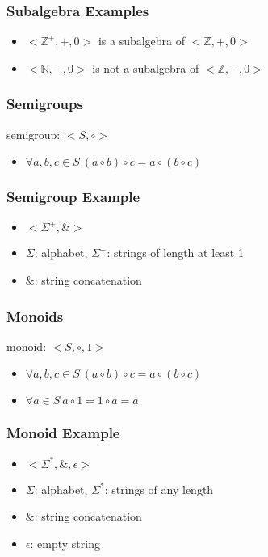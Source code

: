 \documentclass[dvipsnames]{beamer}
\begin{document}
\begin{frame}
  \frametitle{Subalgebra Examples}

  \begin{itemize}
    \item $<\mathbb{Z}^+,+,0>$ is a subalgebra of $<\mathbb{Z},+,0>$
    \pause
    \item $<\mathbb{N},-,0>$ is not a subalgebra of $<\mathbb{Z},-,0>$
  \end{itemize}
\end{frame}

\begin{frame}
  \frametitle{Semigroups}

  \begin{definition}
    \alert{semigroup}: $<S,\circ>$
    \begin{itemize}
      \item $\forall a,b,c \in S~(a \circ b) \circ c = a \circ (b \circ c)$
    \end{itemize}
  \end{definition}
\end{frame}

\begin{frame}
  \frametitle{Semigroup Example}

  \begin{itemize}
    \item $<\Sigma^+,\&>$

    \medskip
    \item $\Sigma$: alphabet, $\Sigma^+$: strings of length at least 1
    \item $\&$: string concatenation
  \end{itemize}
\end{frame}

\begin{frame}
  \frametitle{Monoids}

  \begin{definition}
    \alert{monoid}: $<S,\circ,1>$

    \begin{itemize}
      \item $\forall a,b,c \in S~(a \circ b) \circ c = a \circ (b \circ c)$
      \item $\forall a \in S~a \circ 1 = 1 \circ a = a$
    \end{itemize}
  \end{definition}
\end{frame}

\begin{frame}
  \frametitle{Monoid Example}

  \begin{itemize}
    \item $<\Sigma^*,\&,\epsilon>$

    \medskip
    \item $\Sigma$: alphabet, $\Sigma^*$: strings of any length
    \item $\&$: string concatenation
    \item $\epsilon$: empty string
  \end{itemize}
\end{frame}
\end{document}
